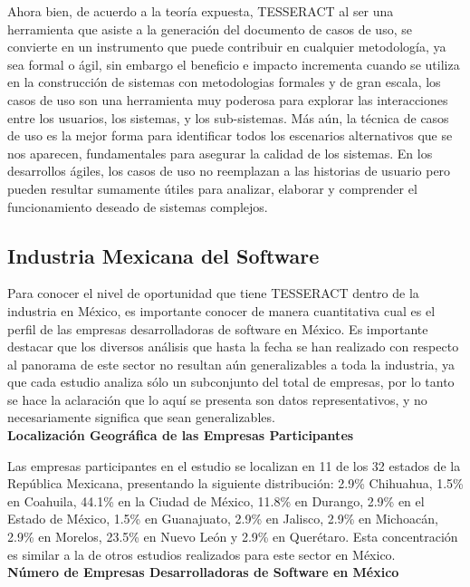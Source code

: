 Ahora bien, de acuerdo a la teoría expuesta, TESSERACT al ser una herramienta que asiste a la generación del documento de casos de uso, se convierte en un instrumento que puede contribuir en cualquier metodología, ya sea formal o ágil, sin embargo el beneficio e impacto incrementa cuando se utiliza en la construcción de sistemas con metodologias formales y de gran escala, los casos de uso son una herramienta muy poderosa para explorar las interacciones entre los usuarios, los sistemas, y los sub-sistemas. Más aún, la técnica de casos de uso es la mejor forma para identificar todos los escenarios alternativos que se nos aparecen, fundamentales para asegurar la calidad de los sistemas. En los desarrollos ágiles, los casos de uso no reemplazan a las historias de usuario pero pueden resultar sumamente útiles para analizar, elaborar y comprender el funcionamiento deseado de sistemas complejos.

\subsection{Industria Mexicana del Software}

Para conocer el nivel de oportunidad que tiene TESSERACT dentro de la industria en México, es importante conocer de manera cuantitativa cual es el perfil de las empresas desarrolladoras de software en México. Es importante destacar que los diversos análisis que hasta la fecha se han realizado con respecto al panorama de este sector no resultan aún generalizables a toda la industria, ya que cada estudio analiza sólo un subconjunto del total de empresas, por lo tanto se hace la aclaración que lo aquí se presenta son datos representativos, y no necesariamente significa que sean generalizables.\\

\textbf{Localización Geográfica de las Empresas Participantes}
 
Las empresas participantes en el estudio se localizan en 11 de los 32 estados de la República Mexicana, presentando la siguiente distribución: 2.9\% Chihuahua, 1.5\%  en Coahuila, 44.1\%  en la Ciudad de México, 11.8\%  en Durango, 2.9\%  en el Estado de México, 1.5\%  en Guanajuato, 2.9\%  en Jalisco, 2.9\%  en Michoacán, 2.9\%  en Morelos, 23.5\%  en Nuevo León y 2.9\%  en Querétaro. Esta concentración es similar a la de otros estudios realizados para este sector en México.\\

\textbf{Número de Empresas Desarrolladoras de Software en México}

